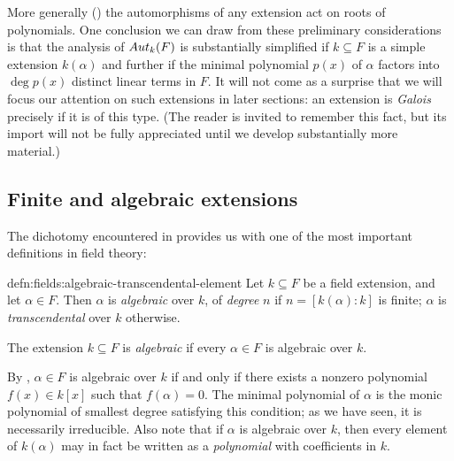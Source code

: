 More generally () the
automorphisms of any extension act on roots of polynomials. One
conclusion we can draw from these preliminary considerations is that
the analysis of $Aut_k(F)$ is substantially simplified if
$k \subseteq F$ is a simple extension $k(\alpha)$ and further if the
minimal polynomial $p(x)$ of $\alpha$ factors into $\deg p(x)$
distinct linear terms in $F$. It will not come as a surprise that we
will focus our attention on such extensions in later sections: an
extension is \emph{Galois} precisely if it is of this type. (The
reader is invited to remember this fact, but its import will not be
fully appreciated until we develop substantially more material.)

\subsection{Finite and algebraic extensions}%
\label{subsec:fields:finite-and-algebraic-extensions}
The dichotomy encountered in  provides us with
one of the most important definitions in field theory:

\begin{defn}{}{defn:fields:algebraic-transcendental-element}
  Let $k \subseteq F$ be a field extension, and let $\alpha \in
  F$. Then $\alpha$ is \emph{algebraic} over $k$, of \emph{degree} $n$
  if $n = [k(\alpha) : k]$ is finite; $\alpha$ is
  \emph{transcendental} over $k$ otherwise.

  The extension $k \subseteq F$ is \emph{algebraic} if every
  $\alpha \in F$ is algebraic over $k$.
\end{defn}
By , $\alpha \in F$ is algebraic over $k$ if and
only if there exists a nonzero polynomial $f(x) \in k[x]$ such that
$f(\alpha) = 0$. The minimal polynomial of $\alpha$ is the monic
polynomial of smallest degree satisfying this condition; as we have
seen, it is necessarily irreducible.  Also note that if $\alpha$ is
algebraic over $k$, then every element of $k(\alpha)$ may in fact be
written as a \emph{polynomial} with coefficients in $k$.

